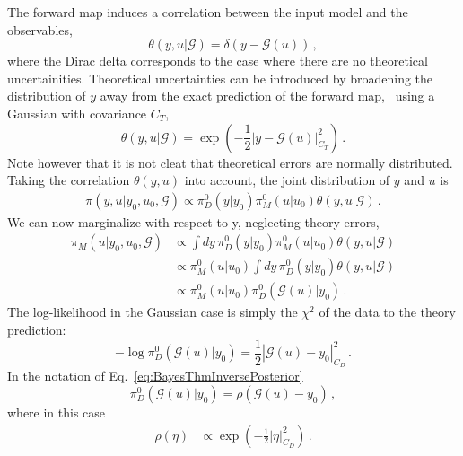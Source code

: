 The forward map induces a correlation between the input model and the
observables, 
\begin{equation}
  \label{eq:ThetaCorr}
  \theta(y,u|\mathcal{G}) = \delta\left(y - \mathcal{G}(u)\right)\, ,
\end{equation}
where the Dirac delta corresponds to the case where there are no theoretical
uncertainities. Theoretical uncertainties can be introduced by broadening the
distribution of $y$ away from the exact prediction of the forward map, \eg\
using a Gaussian with covariance $C_T$,
\begin{equation}
  \label{eq:TheoryErrors}
  \theta(y,u|\mathcal{G}) = \exp\left(
    -\frac12 
    \left| y - \mathcal{G}(u)
    \right|_{C_T}^2\right)\, .
\end{equation}
Note however that it is not cleat that theoretical errors are normally
distributed. Taking the correlation $\theta(y,u)$ into account, the joint
distribution of $y$ and $u$ is
\begin{align}
  \label{eq:JointYAndU}
  \pi(y,u|y_0,u_0,\mathcal{G}) \propto 
  \pi_{D}^0(y|y_0) \pi_{M}^0(u|u_0) \theta(y,u|\mathcal{G})\, .
\end{align}
We can now marginalize with respect to y, neglecting theory errors, 
\begin{align}
  \label{eq:MarginOne}
  \pi_M(u|y_0,u_0,\mathcal{G}) 
  &\propto \int dy\, \pi_{D}^0(y|y_0) \pi_{M}^0(u|u_0) 
    \theta(y,u|\mathcal{G}) \\
  & \propto \pi_{M}^0(u|u_0)  \int dy\, \pi_{D}^0(y|y_0) 
    \theta(y,u|\mathcal{G}) \\
  & \propto \pi_{M}^0(u|u_0) \pi_{D}^0(\mathcal{G}(u)|y_0)\, .
\end{align}
The log-likelihood in the Gaussian case is simply the $\chi^2$ of the data to
the theory prediction:
\begin{equation}
  \label{eq:LikelyChiSq}
  -\log\pi_D^0(\mathcal{G}(u)|y_0) =  
      \frac12 \left|
      \mathcal{G}(u) - y_0
      \right|_{C_D}^2
    \, .
\end{equation}
In the notation of Eq.~\ref{eq:BayesThmInversePosterior}
\begin{equation}
  \label{eq:IdentifyRho}
  \pi_D^0(\mathcal{G}(u)|y_0) = \rho\left(
    \mathcal{G}(u) - y_0
  \right)\, ,
\end{equation}
where in this case 
\begin{align}
  \label{eq:RhoGauss}
  \rho(\eta) &\propto \exp\left(
               -\frac12 \left|\eta\right|_{C_D}^2
               \right)\, .
\end{align}
